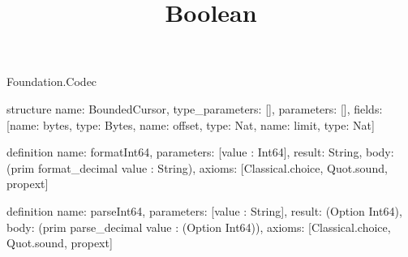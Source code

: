 \begin{lexlean}{Foundation.Codec}
\title{Boolean}
\begin{semanticmodule}
structure{
  name: BoundedCursor,
  type_parameters: [],
  parameters: [],
  fields: [{name: bytes, type: Bytes}, {name: offset, type: Nat}, {name: limit, type: Nat}]
}

definition{
  name: formatInt64,
  parameters: [value : Int64],
  result: String,
  body: (prim format_decimal value : String),
  axioms: [Classical.choice, Quot.sound, propext]
}

definition{
  name: parseInt64,
  parameters: [value : String],
  result: (Option Int64),
  body: (prim parse_decimal value : (Option Int64)),
  axioms: [Classical.choice, Quot.sound, propext]
}
\end{semanticmodule}
\end{lexlean}
